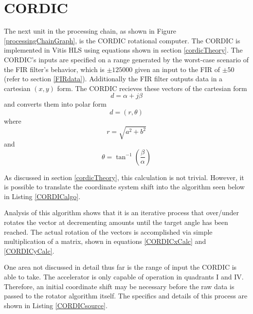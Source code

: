\documentclass[../report_polarFIR.tex]{subfiles}
\begin{document}
\chapter{CORDIC}

The next unit in the processing chain, as shown in Figure \ref{processingChainGraph}, is the CORDIC rotational computer. The CORDIC is implemented in Vitis HLS using equations shown in section \ref{cordicTheory}. The CORDIC's inputs are specified on a range generated by the worst-case scenario of the FIR filter's behavior, which is $\pm 125000$ given an input to the FIR of $\pm 50$ (refer to section \ref{FIRdata}). Additionally the FIR filter outputs data in a cartesian $(x, y)$ form. The CORDIC recieves these vectors of the cartesian form 
\begin{equation}
	d = \alpha + j\beta
\end{equation}
and converts them into polar form
\begin{equation}
	d = (r, \theta)
\end{equation}
where
\begin{equation}
	r = \sqrt{a^2 + b^2}
\end{equation}
and
\begin{equation}
	\theta = \tan^{-1}\left({\frac{\beta}{\alpha}}\right)
\end{equation}

As discussed in section \ref{cordicTheory}, this calculation is not trivial. However, it is possible to translate the coordinate system shift into the algorithm seen below in Listing \ref{CORDICalgo}.

		\begin{singlespace}
            
        \end{singlespace}

Analysis of this algorithm shows that it is an iterative process that over/under rotates the vector at decrementing amounts until the target angle has been reached. The actual rotation of the vectors is accomplished via simple multiplication of a matrix, shown in equations \ref{CORDICxCalc} and \ref{CORDICyCalc}. 

One area not discussed in detail thus far is the range of input the CORDIC is able to take. The accelerator is only capable of operation in quadrants I and IV. Therefore, an initial coordinate shift may be necessary before the raw data is passed to the rotator algorithm itself. The specifics and details of this process are shown in Listing \ref{CORDICsource}.
\end{document}
